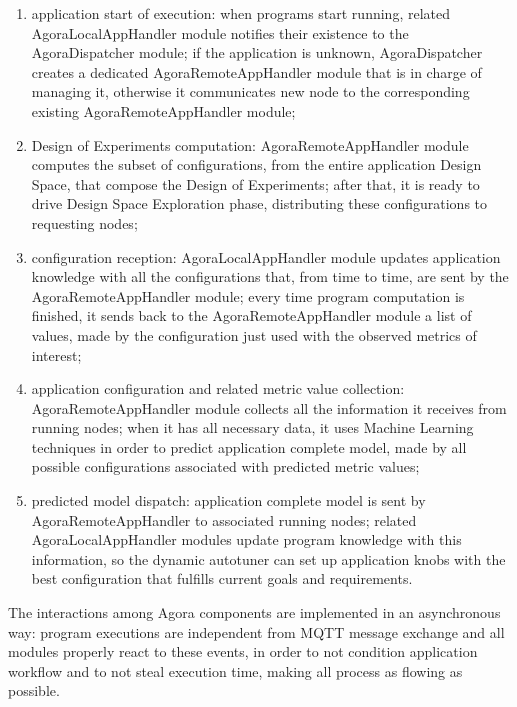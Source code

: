 \begin{enumerate}

    \item application start of execution: when programs start running, related AgoraLocalAppHandler module notifies their existence to the AgoraDispatcher module; if the application is unknown, AgoraDispatcher creates a dedicated AgoraRemoteAppHandler module that is in charge of managing it, otherwise it communicates new node to the corresponding existing AgoraRemoteAppHandler module;
    
    \item Design of Experiments computation: AgoraRemoteAppHandler module computes the subset of configurations, from the entire application Design Space, that compose the Design of Experiments; after that, it is ready to drive Design Space Exploration phase, distributing these configurations to requesting nodes;
    
    \item configuration reception: AgoraLocalAppHandler module updates application knowledge with all the configurations that, from time to time, are sent by the AgoraRemoteAppHandler module; every time program computation is finished, it sends back to the AgoraRemoteAppHandler module a list of values, made by the configuration just used with the observed metrics of interest;
    
    \item application configuration and related metric value collection: A\-go\-ra\-Remote\-App\-Handler module collects all the information it receives from running nodes; when it has all necessary data, it uses Machine Learning techniques in order to predict application complete model, made by all possible configurations associated with predicted metric values;
    
    \item predicted model dispatch: application complete model is sent by AgoraRemoteAppHandler to associated running nodes; related AgoraLocalAppHandler modules update program knowledge with this information, so the dynamic autotuner can set up application knobs with the best configuration that fulfills current goals and requirements.

\end{enumerate}

The interactions among Agora components are implemented in an asynchronous way: program executions are independent from MQTT message exchange and all modules properly react to these events, in order to not condition application workflow and to not steal execution time, making all process as flowing as possible.
